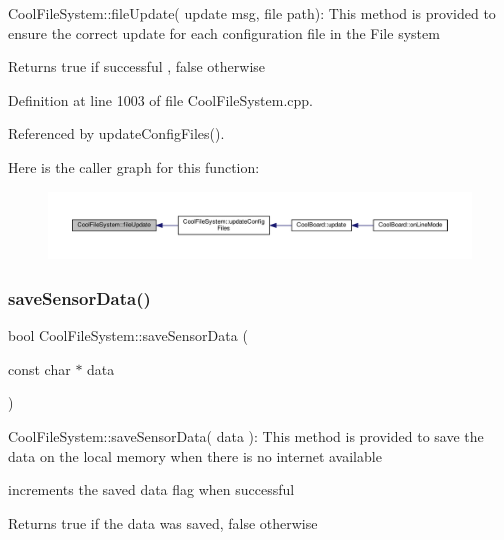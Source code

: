 Cool\+File\+System\+::file\+Update( update msg, file path)\+: This method is provided to ensure the correct update for each configuration file in the File system

\begin{DoxyReturn}{Returns}
true if successful , false otherwise 
\end{DoxyReturn}


Definition at line 1003 of file Cool\+File\+System.\+cpp.



Referenced by update\+Config\+Files().

Here is the caller graph for this function\+:
\nopagebreak
\begin{figure}[H]
\begin{center}
\leavevmode
\includegraphics[width=350pt]{db/d0c/class_cool_file_system_a13f2958f5b87757c31fc53797a30d23a_icgraph}
\end{center}
\end{figure}
\mbox{\label{class_cool_file_system_afa3a4feae94871d4d3b6bebb701c2e67}} 
\subsubsection{\texorpdfstring{save\+Sensor\+Data()}{saveSensorData()}}
{\footnotesize\ttfamily bool Cool\+File\+System\+::save\+Sensor\+Data (\begin{DoxyParamCaption}\item[{const char $\ast$}]{data }\end{DoxyParamCaption})}

Cool\+File\+System\+::save\+Sensor\+Data( data )\+: This method is provided to save the data on the local memory when there is no internet available

increments the saved data flag when successful

\begin{DoxyReturn}{Returns}
true if the data was saved, false otherwise 
\end{DoxyReturn}


